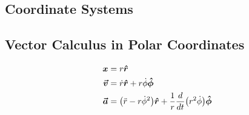 \subsection{Coordinate Systems} 

\subsection{Vector Calculus in Polar Coordinates}

\begin{align*}
\boldsymbol{x}& = r \boldsymbol{\hat{r}}\\
\boldsymbol{\vec{v}}& = \dot{r} \boldsymbol{\hat{r}} + r \dot{\phi} \boldsymbol{\hat{\phi}}\\
\label{eq:a_vec_def}\boldsymbol{\vec{a}}& = \paren{\ddot{r} - r \dot{\phi}^2} \boldsymbol{\hat{r}} + \frac{1}{r} \frac{d}{dt} \paren{r^2 \dot{\phi}} \boldsymbol{\hat{\phi}}
\end{align*}
